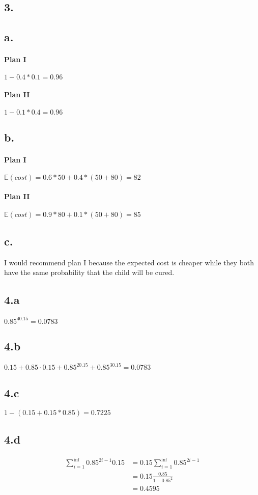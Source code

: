 \documentclass{article}
\begin{document}
\subsection*{3.}
\subsection*{a.}
\paragraph{Plan I}  $1 - 0.4*0.1 = 0.96$
\paragraph{Plan II} $1 - 0.1*0.4 = 0.96$
\subsection*{b.}
\paragraph{Plan I}  $\mathbb{E}(cost)=0.6*50 + 0.4*(50+80) = 82$
\paragraph{Plan II} $\mathbb{E}(cost)=0.9*80 + 0.1*(50+80) = 85$
\subsection*{c.} 
I would recommend plan I because the expected cost is cheaper while they both
have the same probability that the child will be cured.

\subsection*{4.a}
$0.85^40.15=0.0783$

\subsection*{4.b}
$0.15 +0.85\cdot 0.15 +0.85^20.15+ 0.85^30.15=0.0783$

\subsection*{4.c}
$1 - (0.15 + 0.15*0.85) = 0.7225$

\subsection*{4.d}
\begin{align*}
	\sum_{i=1}^{\inf}0.85^{2i-1}0.15 &= 0.15\sum_{i=1}^{\inf}0.85^{2i-1}\\
																	 &= 0.15\frac{0.85}{1 - 0.85^{2}}\\
																	 &= 0.4595
\end{align*}
\end{document}
